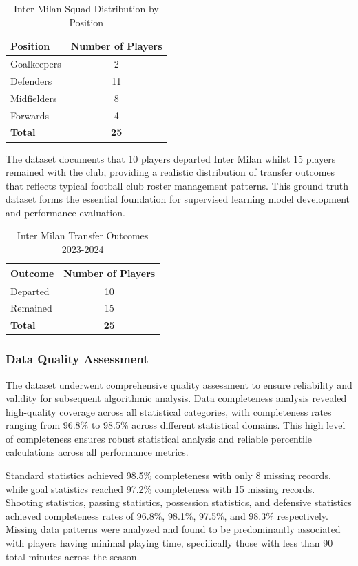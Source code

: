 \begin{table}[h]
\centering
\caption{Inter Milan Squad Distribution by Position}
\label{tab:inter_squad}
\begin{tabular}{lc}
\toprule
\textbf{Position} & \textbf{Number of Players} \\
\midrule
Goalkeepers & 2 \\
Defenders & 11 \\
Midfielders & 8 \\
Forwards & 4 \\
\midrule
\textbf{Total} & \textbf{25} \\
\bottomrule
\end{tabular}
\end{table}

The dataset documents that 10 players departed Inter Milan whilst 15 players remained with the club, providing a realistic distribution of transfer outcomes that reflects typical football club roster management patterns. This ground truth dataset forms the essential foundation for supervised learning model development and performance evaluation.

\begin{table}[h]
\centering
\caption{Inter Milan Transfer Outcomes 2023-2024}
\label{tab:transfer_outcomes}
\begin{tabular}{lc}
\toprule
\textbf{Outcome} & \textbf{Number of Players} \\
\midrule
Departed & 10 \\
Remained & 15 \\
\midrule
\textbf{Total} & \textbf{25} \\
\bottomrule
\end{tabular}
\end{table}

\subsubsection{Data Quality Assessment}

The dataset underwent comprehensive quality assessment to ensure reliability and validity for subsequent algorithmic analysis. Data completeness analysis revealed high-quality coverage across all statistical categories, with completeness rates ranging from 96.8\% to 98.5\% across different statistical domains. This high level of completeness ensures robust statistical analysis and reliable percentile calculations across all performance metrics.

Standard statistics achieved 98.5\% completeness with only 8 missing records, while goal statistics reached 97.2\% completeness with 15 missing records. Shooting statistics, passing statistics, possession statistics, and defensive statistics achieved completeness rates of 96.8\%, 98.1\%, 97.5\%, and 98.3\% respectively. Missing data patterns were analyzed and found to be predominantly associated with players having minimal playing time, specifically those with less than 90 total minutes across the season.

